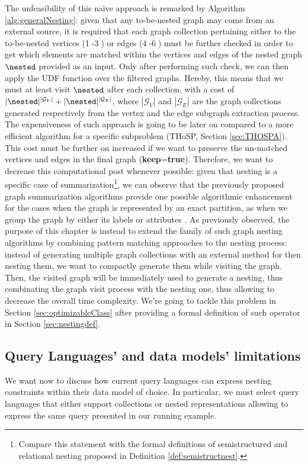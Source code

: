 The unfeasibility of this naïve approach is remarked by Algorithm \vref{alg:generalNesting}: given that any to-be-nested graph may come from an external source, it is required that each graph collection pertaining either to the to-be-nested vertices (\textcircled{\raisebox{-.5pt}1}-\textcircled{\raisebox{-.5pt}3})  or edges (\textcircled{\raisebox{-.5pt}4}-\textcircled{\raisebox{-.5pt}6}) must be further checked in order to get which elements are matched within the vertices and edges of the nested graph $\nested$ provided as an input. Only after performing such check, we can then apply the UDF function over the filtered graphs. Hereby, this means that we must at least visit $\nested$ after each collection, with a cost of $|\nested|^{|\mathcal{G}_V|}+|\nested|^{|\mathcal{G}_E|}$, where ${|\mathcal{G}_V|}$ and ${|\mathcal{G}_E|}$ are the graph collections generated respectively from the vertex and the edge subgraph extraction process. The expensiveness of such approach is going to be later on compared to a more efficient algorithm for a specific subproblem (THoSP, Section \ref{sec:THOSPA}). This cost must be further on increased if we want to preserve the un-matched vertices and edges in the final graph (\textbf{keep}=\textbf{true}). Therefore, we want to decrease this computational post whenever possible: given that nesting is a specific case of summarization\footnote{Compare this statement with the formal definitions of semistructured and relational nesting proposed in Definition \vref{def:semistructnest}.}, we can observe that the previously proposed graph summarization algorithms provide one possible algorithmic enhancement for the cases when the graph is represented by an exact partition, as when we group the graph by either its labels or attributes \cite{JunghannsPR17}. As previously observed, the purpose of this chapter is instead to extend the family of such graph nesting algorithms by combining pattern matching approaches to the nesting process: instead of generating multiple graph collections with an external method for then nesting them, we want to compactly generate them while visiting the graph. Then, the visited graph will be immediately used to generate a nesting, thus combinating the graph visit process with the nesting one, thus allowing to decrease the overall time complexity. We're going to tackle this problem in Section \vref{sec:optimizableClass} after providing a formal definition of such operator in Section \vref{sec:nestingdef}.


\subsection{Query Languages' and data models' limitations}\label{subsec:pathsumm}
We want now to discuss how current query languages can express nesting constraints within their data model of choice. In particular, we must select query languages that either support collections or nested representations allowing to express the same query presented in our running example. 


